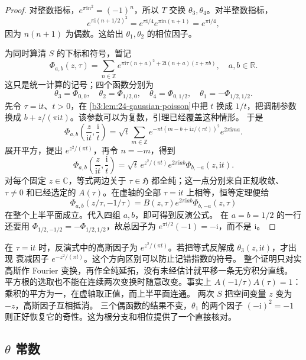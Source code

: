 \begin{proof}
对整数指标，\(e^{\pi\mathrm in^2}=(-1)^n\)，所以 \(T\) 交换
\(\theta_3,\theta_4\)。对半整数指标，
\[
 e^{\pi\mathrm i(n+1/2)^2}
   =e^{\pi\mathrm i/4}e^{\pi\mathrm in(n+1)}
   =e^{\pi\mathrm i/4},
\]
因为 \(n(n+1)\) 为偶数。这给出 \(\theta_1,\theta_2\) 的相位因子。

为同时算清 \(S\) 的下标和符号，暂记
\[
 \Phi_{a,b}(z,\tau)=
 \sum_{n\in\mathbb Z}e^{\pi\mathrm i\tau(n+a)^2+
                         2\mathrm i(n+a)(z+\pi b)},
 \quad a,b\in\mathbb R.
\]
这只是统一计算的记号；四个函数分别为
\[
 \theta_3=\Phi_{0,0},\quad
 \theta_2=\Phi_{1/2,0},\quad
 \theta_4=\Phi_{0,1/2},\quad
 \theta_1=-\Phi_{1/2,1/2}.
\]
先令 \(\tau=\mathrm it\)、\(t>0\)，在
\cref{b3:lem:24-gaussian-poisson}中把 \(t\) 换成 \(1/t\)，把调制参数
换成 \(b+z/(\pi\mathrm it)\)。该参数可以为复数，引理已经覆盖这种情形。
于是
\[
 \Phi_{a,b}\left(\frac z{\mathrm it},\frac{\mathrm i}t\right)
 =\sqrt t\sum_{m\in\mathbb Z}
    e^{-\pi t(m-b+\mathrm iz/(\pi t))^2}e^{2\pi\mathrm ima}.
\]
展开平方，提出 \(e^{z^2/(\pi t)}\)，再令 \(n=-m\)，得到
\[
 \Phi_{a,b}\left(\frac z{\mathrm it},\frac{\mathrm i}t\right)
 =\sqrt t\,e^{z^2/(\pi t)}e^{2\pi\mathrm iab}
                    \Phi_{b,-a}(z,\mathrm it).
\]
对每个固定 \(z\in\mathbb C\)，等式两边关于 \(\tau\in\mathfrak H\)
都全纯；这一点分别来自正规收敛、\(\tau\ne0\) 和已经选定的
\(A(\tau)\)。在虚轴的全部 \(\tau=\mathrm it\) 上相等，恒等定理便给
\[
 \Phi_{a,b}(z/\tau,-1/\tau)
 =B(z,\tau)e^{2\pi\mathrm iab}\Phi_{b,-a}(z,\tau)
\]
在整个上半平面成立。代入四组 \(a,b\)，即可得到反演公式。
在 \(a=b=1/2\) 的一行还要用
\(\Phi_{1/2,-1/2}=-\Phi_{1/2,1/2}\)，故总因子为
\(e^{\pi\mathrm i/2}(-1)=-\mathrm i\)，而不是 \(\mathrm i\)。
\end{proof}

在 \(\tau=\mathrm it\) 时，反演式中的高斯因子为
\(e^{z^2/(\pi t)}\)。若把等式反解成 \(\theta_3(z,\mathrm it)\)，才出现
衰减因子 \(e^{-z^2/(\pi t)}\)。这个方向区别可以防止记错指数的符号。
整个证明只对实高斯作 Fourier 变换，再作全纯延拓，没有未经估计就平移一条无穷积分直线。
\ProseParagraphBreak
平方根的选取也不能在连续两次变换时随意改变。事实上
\(A(-1/\tau)A(\tau)=1\)：乘积的平方为一，在虚轴取正值，而上半平面连通。
两次 \(S\) 把空间变量 \(z\) 变为 \(-z\)，高斯因子互相抵消。
三个偶函数的结果不变，\(\theta_1\) 的两个因子
\((-\mathrm i)^2=-1\) 则正好恢复它的奇性。这为根分支和相位提供了一个直接核对。

\subsection{\texorpdfstring{\(\theta\)}{\AnalysisPdfTheta} 常数}
\label{b3:subsec:240104}

